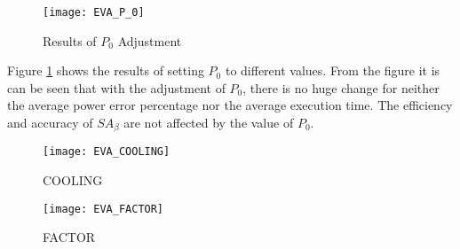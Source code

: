 	\begin{figure}[htb]
		\begin{center}
			\texttt{[image: EVA\_P\_0]}
			\caption{Results of $P_{0}$ Adjustment}
			\label{fig:EVA_P_0}
		\end{center}
	\end{figure}

	Figure \ref{fig:EVA_P_0} shows the results of setting $P_{0}$ to different values.
	From the figure it is can be seen that with the adjustment of $P_{0}$,
	there is no huge change for neither the average power error percentage nor the average
	execution time. The efficiency and accuracy of $SA_{\beta}$ are not affected by the
	value of $P_{0}$.

	

	\begin{figure}[htb]
		\begin{center}
			\texttt{[image: EVA\_COOLING]}
			\caption{COOLING}
			\label{fig:EVA_COOLING}
		\end{center}
	\end{figure}

	\begin{figure}[htb]
		\begin{center}
			\texttt{[image: EVA\_FACTOR]}
			\caption{FACTOR}
			\label{fig:EVA_FACTOR}
		\end{center}
	\end{figure}
